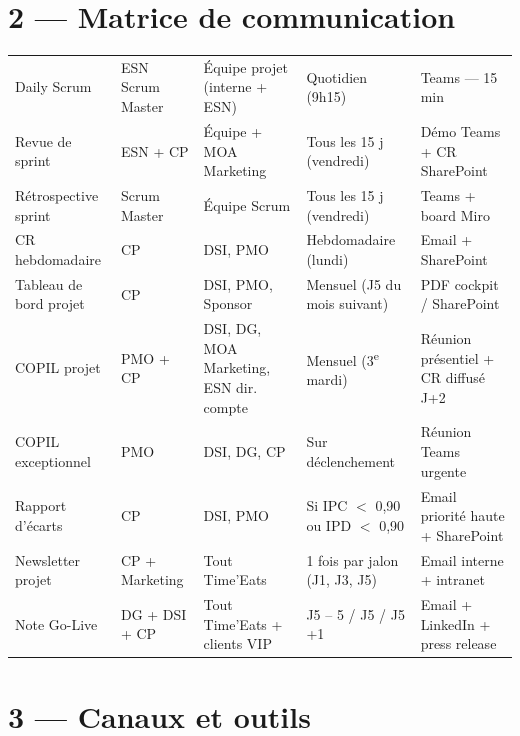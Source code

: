 \documentclass[11pt,a4paper,oneside]{report}
\begin{document}
\section*{2 --- Matrice de communication}

\renewcommand{\arraystretch}{1.4}
\begin{tabularx}{\textwidth}{L{3.8cm} L{2.5cm} L{3.2cm} L{2.3cm} Y}
\toprule
{} &  &  &  &  \\
\midrule
Daily Scrum            & ESN Scrum Master & Équipe projet (interne + ESN) & Quotidien (9h15) & Teams --- 15 min \\
Revue de sprint        & ESN + CP & Équipe + MOA Marketing & Tous les 15 j (vendredi) & Démo Teams + CR SharePoint \\
Rétrospective sprint   & Scrum Master & Équipe Scrum & Tous les 15 j (vendredi) & Teams + board Miro \\
CR hebdomadaire        & CP & DSI, PMO & Hebdomadaire (lundi) & Email + SharePoint \\
Tableau de bord projet & CP & DSI, PMO, Sponsor & Mensuel (J5 du mois suivant) & PDF cockpit / SharePoint \\
COPIL projet           & PMO + CP & DSI, DG, MOA Marketing, ESN dir. compte & Mensuel (3\textsuperscript{e} mardi) & Réunion présentiel + CR diffusé J+2 \\
COPIL exceptionnel     & PMO & DSI, DG, CP & Sur déclenchement & Réunion Teams urgente \\
Rapport d'écarts       & CP & DSI, PMO & Si IPC $<$ 0{,}90 ou IPD $<$ 0{,}90 & Email priorité haute + SharePoint \\
Newsletter projet      & CP + Marketing & Tout Time'Eats & 1 fois par jalon (J1, J3, J5) & Email interne + intranet \\
Note Go-Live           & DG + DSI + CP & Tout Time'Eats + clients VIP & J5 -- 5 / J5 / J5 +1 & Email + LinkedIn + press release \\
\bottomrule
\end{tabularx}

\section*{3 --- Canaux et outils}
\end{document}
